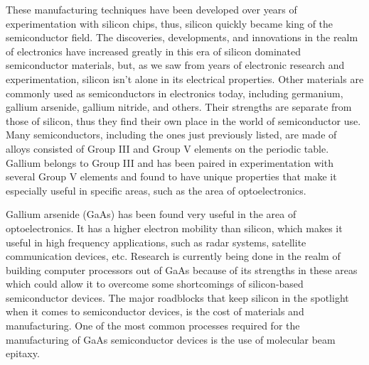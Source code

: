 \documentclass[12pt]{article}
\begin{document}
\begin{flushleft}
These manufacturing techniques have been developed
over years of experimentation with silicon chips, thus,
silicon quickly became king of the semiconductor field.
The discoveries, developments, and innovations in the
realm of electronics have increased greatly in this
era of silicon dominated semiconductor materials, but,
as we saw from years of electronic research and experimentation,
silicon isn't alone in its electrical properties. Other
materials are commonly used as semiconductors in electronics
today, including germanium, gallium arsenide, gallium
nitride, and others. Their strengths are separate from
those of silicon, thus they find their own place in
the world of semiconductor use. Many semiconductors,
including the ones just previously listed, are made
of alloys consisted of Group III and Group V elements
on the periodic table. Gallium belongs to Group III
and has been paired in experimentation with several
Group V elements and found to have unique properties
that make it especially useful in specific areas, such
as the area of optoelectronics.

Gallium arsenide (GaAs) has been found very useful
in the area of optoelectronics. It has a higher electron
mobility than silicon, which makes it useful in high
frequency applications, such as radar systems, satellite
communication devices, etc. Research is currently being
done in the realm of building computer processors out
of GaAs because of its strengths in these areas which
could allow it to overcome some shortcomings of silicon-based
semiconductor devices. The major roadblocks that keep
silicon in the spotlight when it comes to semiconductor
devices, is the cost of materials and manufacturing.
One of the most common processes required for the manufacturing
of GaAs semiconductor devices is the use of molecular
beam epitaxy.


\end{flushleft}
\end{document}
